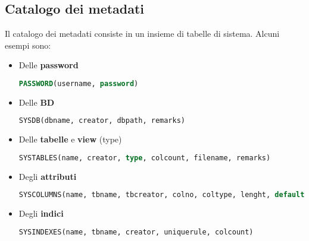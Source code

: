 \subsection{Catalogo dei metadati}
Il catalogo dei metadati consiste in un insieme di tabelle di sistema. Alcuni esempi sono:
\begin{itemize}
	\item Delle \textbf{password}
	\begin{lstlisting}[language=SQL]
		PASSWORD(username, password)
	\end{lstlisting}
	\item Delle \textbf{BD}
	\begin{lstlisting}[language=SQL]
		SYSDB(dbname, creator, dbpath, remarks)
	\end{lstlisting}
	\item Delle \textbf{tabelle} e \textbf{view} (type)
	\begin{lstlisting}[language=SQL]
		SYSTABLES(name, creator, type, colcount, filename, remarks)
	\end{lstlisting}
	\item Degli \textbf{attributi}
	\begin{lstlisting}[language=SQL]
		SYSCOLUMNS(name, tbname, tbcreator, colno, coltype, lenght, default, remarks)
	\end{lstlisting}
	\item Degli \textbf{indici}
	\begin{lstlisting}[language=SQL]
		SYSINDEXES(name, tbname, creator, uniquerule, colcount)
	\end{lstlisting}
\end{itemize}